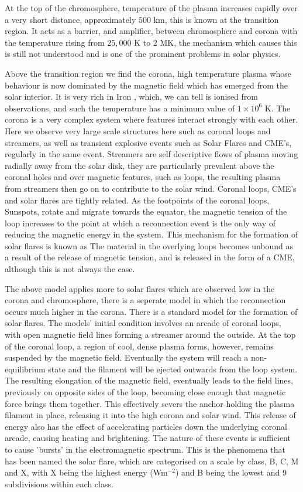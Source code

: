 At the top of the chromosphere, temperature of the plasma increases rapidly over a very short distance, approximately $500$ km, this is known at the transition region.
It acts as a barrier, and amplifier, between chromosphere and corona with the temperature rising from $25,000$ K to $2$ MK, the mechanism which causes this is still not understood and is one of the prominent problems in solar physics.

Above the transition region we find the corona, high temperature plasma whose behaviour is now dominated by the magnetic field which has emerged from the solar interior.
It is very rich in Iron , which, we can tell is ionised from observations, and such the temperature has a minimum value of $1 \times 10^6$ K.
The corona is a very complex system where features interact strongly with each other.
Here we observe very large scale structures here such as coronal loops and streamers, as well as transient explosive events such as Solar Flares and CME's, regularly in the same event.
Streamers are self descriptive flows of plasma moving radially away from the solar disk, they are particularly prevalent above the coronal holes and over magnetic features, such as loops, the resulting plasma from streamers then go on to contribute to the solar wind.
Coronal loops, CME's and solar flares are tightly related.
As the footpoints of the coronal loops, Sunspots, rotate and migrate towards the equator, the magnetic tension of the loop increases to the point at which a reconnection event is the only way of reducing the magnetic energy in the system.
This mechanism for the formation of solar flares is known as 
The material in the overlying loops becomes unbound as a result of the release of magnetic tension, and is released in the form of a CME, although this is not always the case.

The above model applies more to solar flares which are observed low in the corona and chromosphere, there is a seperate model in which the reconnection occurs much higher in the corona.
There is a standard model for the formation of solar flares.
The models' initial condition involves an arcade of coronal loops, with open magnetic field lines forming a streamer around the outside.
At the top of the coronal loop, a region of cool, dense plasma forms, however, remains suspended by the magnetic field.
Eventually the system will reach a non-equilibrium state and the filament will be ejected outwards from the loop system.
The resulting elongation of the magnetic field, eventually leads to the field lines, previously on opposite sides of the loop, becoming close enough that magnetic force brings them together.
This effectively severs the anchor holding the plasma filament in place, releasing it into the high corona and solar wind. 
This release of energy also has the effect of accelerating particles down the underlying coronal arcade, causing heating and brightening.
The nature of these events is sufficient to cause 'bursts' in the electromagnetic spectrum.
This is the phenomena that has been named the solar flare, which are categorised on a scale by class, B, C, M and X, with X being the highest energy (Wm$^{-2}$) and B being the lowest and 9 subdivisions within each class. 

